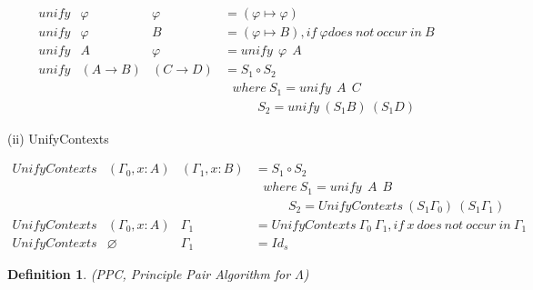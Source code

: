 \documentclass[a4paper,11pt,twoside]{report}
\newtheorem{def1}{\textbf{Definition}}[chapter]
\begin{document}
\begin{equation*}
\begin{array}{llll}
unify & \varphi            & \varphi          & = (\varphi \mapsto \varphi)\\
unify & \varphi            & B                & = (\varphi \mapsto B), if\ \varphi does\ not\ occur\ in\ B\\
unify & A                  & \varphi          & = unify\ \ \varphi\ \ A\\
unify & (A\rightarrow B)   & (C\rightarrow D) & = S_1\circ S_2\\
&&&\ \ \ where\ S_1 = unify\ \ A\ \ C\\
&&&\ \ \ \ \ \ \ \ \ \ \ \ S_2 = unify\ (S_1B)\ (S_1D)
\end{array}
\end{equation*}


\noindent (ii) UnifyContexts

\begin{equation*}
\begin{array}{llll}
UnifyContexts & (\Gamma _0,x:A) & (\Gamma _1,x:B) & = S_1\circ S_2\\
&&&\ \ \ where\ S_1 = unify\ \ A\ \ B\\
&&&\ \ \ \ \ \ \ \ \ \ \ \ S_2 = UnifyContexts\ (S_1\Gamma _0)\ (S_1\Gamma _1)\\
UnifyContexts & (\Gamma _0,x:A) & \Gamma _1 & = UnifyContexts\ \Gamma _0\ \Gamma _1, if\ x\ does\ not\ occur\ in\ \Gamma _1\\
UnifyContexts & \varnothing & \Gamma _1 & =  Id_s
\end{array}
\end{equation*}



\begin{def1}
\normalfont (PPC, Principle Pair Algorithm for $\Lambda$)
\end{def1}
\end{document}
